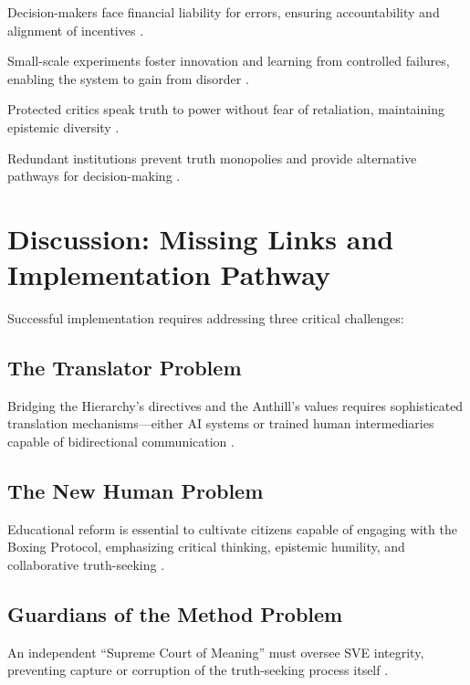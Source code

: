 \documentclass[11pt,a4paper]{article}
\begin{document}
\begin{description}[style=nextline, leftmargin=0pt, labelindent=0pt]
    \item[\textbf{Skin in the Game}] Decision-makers face financial liability for errors, ensuring accountability and alignment of incentives \citep{Taleb2018,HybridModelsMemo}.
    
    \item[\textbf{Right to Neat Chaos}] Small-scale experiments foster innovation and learning from controlled failures, enabling the system to gain from disorder \citep[lines 2315--2316]{HybridModelsMemo}.
    
    \item[\textbf{Institute of ``Holy Fools'' (Yurodivy)}] Protected critics speak truth to power without fear of retaliation, maintaining epistemic diversity \citep[lines 2317]{HybridModelsMemo}.
    
    \item[\textbf{Parallel Structures}] Redundant institutions prevent truth monopolies and provide alternative pathways for decision-making \citep[lines 2318]{HybridModelsMemo}.
\end{description}

\section{Discussion: Missing Links and Implementation Pathway}
Successful implementation requires addressing three critical challenges:

\subsection{The Translator Problem}
Bridging the Hierarchy's directives and the Anthill's values requires sophisticated translation mechanisms—either AI systems or trained human intermediaries capable of bidirectional communication \citep[lines 2320--2322]{HybridModelsMemo}.

\subsection{The New Human Problem}
Educational reform is essential to cultivate citizens capable of engaging with the Boxing Protocol, emphasizing critical thinking, epistemic humility, and collaborative truth-seeking \citep[lines 2323--2326]{HybridModelsMemo}.

\subsection{Guardians of the Method Problem}
An independent ``Supreme Court of Meaning'' must oversee SVE integrity, preventing capture or corruption of the truth-seeking process itself \citep[lines 2327--2331]{HybridModelsMemo}.
\end{document}

